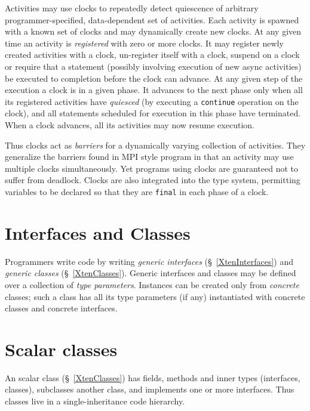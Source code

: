 Activities may use clocks to repeatedly detect quiescence of arbitrary
programmer-specified, data-dependent set of activities. Each activity
is spawned with a known set of clocks and may dynamically create new
clocks. At any given time an activity is {\em registered} with zero or
more clocks. It may register newly created activities with a clock,
un-register itself with a clock, suspend on a clock or require that a
statement (possibly involving execution of new async activities) be
executed to completion before the clock can advance.  At any given
step of the execution a clock is in a given phase. It advances to the
next phase only when all its registered activities have {\em quiesced}
(by executing a {\tt continue} operation on the clock), and all
statements scheduled for execution in this phase have terminated.
When a clock advances, all its activities may now resume execution.

Thus clocks act as {\em barriers} for a dynamically varying collection
of activities. They generalize the barriers found in MPI style program
in that an activity may use multiple clocks simultaneously. Yet
programs using clocks are guaranteed not to suffer from
deadlock. Clocks are also integrated into the \Xten{} type system,
permitting variables to be declared so that they are {\tt final} in each
phase of a clock.

\section{Interfaces and Classes}
Programmers write \Xten{} code by writing {\em generic interfaces}
(\S~\ref{XtenInterfaces}) and {\em generic classes}
(\S~\ref{XtenClasses}). Generic interfaces and classes may be
defined over a collection of {\em type parameters}. Instances can be
created only from {\em concrete} classes; such a class has all its
type parameters (if any) instantiated with concrete classes and
concrete interfaces.

\section{Scalar classes}
An \Xten{} scalar class (\S~\ref{XtenClasses}) has fields, methods and
inner types (interfaces, classes), subclasses another class, and
implements one or more interfaces. Thus \Xten{} classes live in a
single-inheritance code hierarchy.  


